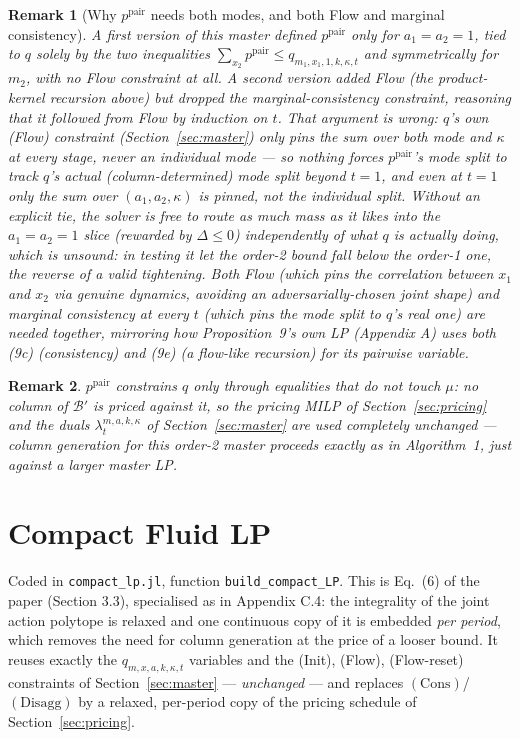 \documentclass[11pt]{article}
\newtheorem{remark}{Remark}
\begin{document}
\begin{remark}[Why $p^{\mathrm{pair}}$ needs both modes, and both Flow and marginal consistency]
\label{rem:order2-both-modes}
A first version of this master defined $p^{\mathrm{pair}}$ only for $a_1=a_2=1$, tied to
$q$ solely by the two inequalities $\sum_{x_2} p^{\mathrm{pair}} \le q_{m_1,x_1,1,k,\kappa,t}$
and symmetrically for $m_2$, with no Flow constraint at all. A second version added Flow
(the product-kernel recursion above) but dropped the marginal-consistency constraint,
reasoning that it followed from Flow by induction on $t$. \emph{That argument is wrong}:
$q$'s own (Flow) constraint (Section~\ref{sec:master}) only pins the sum over \emph{both}
mode \emph{and} $\kappa$ at every stage, never an individual mode --- so nothing forces
$p^{\mathrm{pair}}$'s mode split to track $q$'s actual (column-determined) mode split
beyond $t=1$, and even at $t=1$ only the sum over $(a_1,a_2,\kappa)$ is pinned, not the
individual split. Without an explicit tie, the solver is free to route as much mass as it
likes into the $a_1=a_2=1$ slice (rewarded by $\Delta \le 0$) independently of what $q$ is
actually doing, which is unsound: in testing it let the order-2 bound fall \emph{below}
the order-1 one, the reverse of a valid tightening. Both Flow (which pins the
\emph{correlation} between $x_1$ and $x_2$ via genuine dynamics, avoiding an
adversarially-chosen joint shape) and marginal consistency at every $t$ (which pins the
mode split to $q$'s real one) are needed together, mirroring how Proposition~9's own LP
(Appendix A) uses both (9c) (consistency) and (9e) (a flow-like recursion) for its
pairwise variable.
\end{remark}

\begin{remark}
$p^{\mathrm{pair}}$ constrains $q$ only through equalities that do not touch $\mu$: no
column of $\mathcal B'$ is priced against it, so the pricing MILP of
Section~\ref{sec:pricing} and the duals $\lambda_t^{m,a,k,\kappa}$ of
Section~\ref{sec:master} are used completely unchanged --- column generation for this
order-2 master proceeds exactly as in Algorithm~1, just against a larger master LP.
\end{remark}

\section{Compact Fluid LP}
\label{sec:compact}

Coded in \texttt{compact\_lp.jl}, function \texttt{build\_compact\_LP}. This is Eq.~(6) of
the paper (Section 3.3), specialised as in Appendix C.4: the integrality of the joint
action polytope is relaxed and one continuous copy of it is embedded \emph{per period},
which removes the need for column generation at the price of a looser bound. It reuses
exactly the $q_{m,x,a,k,\kappa,t}$ variables and the (Init), (Flow), (Flow-reset)
constraints of Section~\ref{sec:master} --- \emph{unchanged} --- and replaces
$(\mathrm{Cons})$/$(\mathrm{Disagg})$ by a relaxed, per-period copy of the pricing schedule
of Section~\ref{sec:pricing}.
\end{document}
